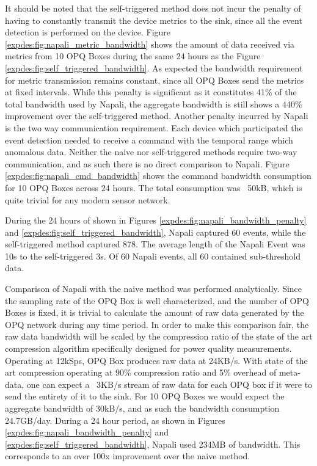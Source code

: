 It should be noted that the self-triggered method does not incur the penalty of having to constantly transmit the device metrics to the sink, since all the event detection is performed on the device.
Figure \ref{expdes:fig:napali_metric_bandwidth} shows the amount of data received via metrics from 10 OPQ Boxes during the same 24 hours as the Figure \ref{expdes:fig:self_triggered_bandwidth}.
As expected the bandwidth requirement for metric transmission remains constant, since all OPQ Boxes send the metrics at fixed intervals.
While this penalty is significant as it constitutes 41\% of the total bandwidth used by Napali, the aggregate bandwidth is still shows a 440\% improvement over the self-triggered method.
Another penalty incurred by Napali is the two way communication requirement.
Each device which participated the event detection needed to receive a command with the temporal range which anomalous data.
Neither the naive nor self-triggered methods require two-way communication, and as such there is no direct comparison to Napali.
Figure \ref{expdes:fig:napali_cmd_bandwidth} shows the command bandwidth consumption for 10 OPQ Boxes across 24 hours.
The total consumption was ~50kB, which is quite trivial for any modern sensor network.

During the 24 hours of shown in Figures \ref{expdes:fig:napali_bandwidth_penalty} and \ref{expdes:fig:self_triggered_bandwidth}, Napali captured 60 events, while the self-triggered method captured 878.
The average length of the Napali Event was 10s to the self-triggered 3s.
Of 60 Napali events, all 60 contained sub-threshold data.

Comparison of Napali with the naive method was performed analytically.
Since the sampling rate of the OPQ Box is well characterized, and the number of OPQ Boxes is fixed, it is trivial to calculate the amount of raw data generated by the OPQ network during any time period.
In order to make this comparison fair, the raw data bandwidth will be scaled by the compression ratio of the state of the art compression algorithm specifically designed for power quality measurements.\cite{zhang2009new}
Operating at 12kSps, OPQ Box produces raw data at 24KB/s.
With state of the art compression operating at 90\% compression ratio and 5\% overhead of meta-data, one can expect a ~3KB/s stream of raw data for each OPQ box if it were to send the entirety of it to the sink.
For 10 OPQ Boxes we would expect the aggregate bandwidth of 30kB/s, and as such the bandwidth consumption 24.7GB/day.
During a 24 hour period, as shown in Figures \ref{expdes:fig:napali_bandwidth_penalty} and \ref{expdes:fig:self_triggered_bandwidth}, Napali used 234MB of bandwidth.
This corresponds to an over 100x improvement over the naive method.

